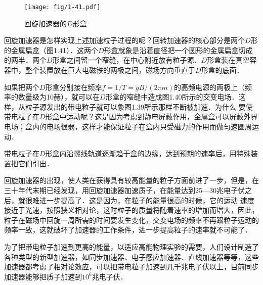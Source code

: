 \begin{figure}[htp]
\centering
\texttt{[image: fig/1-41.pdf]}
\caption{回旋加速器的$D$形盒}
\end{figure}

回旋加速器是怎样实现上述加速粒子过程的呢？回转加速器的核心部分是两个$D$形的金属扁盒（图1.41）．这两个$D$形盒就象是沿着直径把一个圆形的金属扁盒切成的两半．两个$D$形盒之间留一个窄缝，在中心附近放有粒子源．$D$形盒装在真空容器中，整个装置放在巨大电磁铁的两极之间，磁场方向垂直于$D$形盒的底面．

如果把两个$D$形盒分别接在频率$f=1/T=gB/(2\pi m)$的高频电源的两极上（频率的数量级为10赫），就可以在$D$形盒的窄缝中造成图1.40所示的交变电场．这样，从粒子源发出的带电粒子就可以象图1.39所示那样不断被加速．为什么
要使带电粒子在$D$形盒中运动呢？这是因为考虑到静电屏蔽作用，金属盒可以屏蔽外界电场；盒内的电场很弱，这样才能保证粒子在盒内只受磁力的作用而做匀速圆周运动．

带电粒子在$D$形盒内沿螺线轨道逐渐趋于盒的边缘，达到预期的速率后，用特殊装置把它们引出．

回旋加速器的出现，使人类在获得具有较高能量的粒子方面前进了一步，但是，在三十年代末期已经发现，用回旋加速器加速质子，在能量达到25—30兆电子伏之后，就很难进一步提高了．这是因为，在粒子的能量很高的时候，它的运动
速度接近于光速，按照狭义相对论，这时粒子的质量将随着速率的增加而增大，因此，粒子在磁场中回旋一周所需的时间要发生变化，交变电场的频率不再跟粒子运动的频率一致，这就破坏了加速器的工作条件，进一步提高粒子的速率就不可能了．

为了把带电粒子加速到更高的能量，以适应高能物理实验的需要，人们设计制造了各种类型的新型加速器，如同步加速器、电子感应加速器、直线加速器等等，这些加速器都考虑了相对论效应，可以把带电粒子加速到几千兆电子伏以上，目前同步加速器能够把质子加速到$10^6$兆电子伏．

